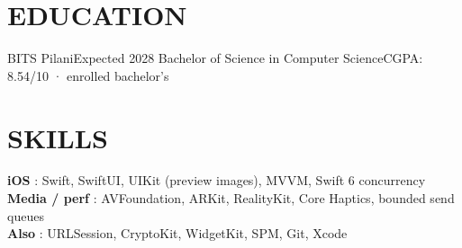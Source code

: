 \section{EDUCATION}
  \resumeSubHeadingListStart
    \resumeSubheading
      {BITS Pilani}{Expected 2028}
      {Bachelor of Science in Computer Science}{CGPA: 8.54/10 · enrolled bachelor's}
  \resumeSubHeadingListEnd

\section{SKILLS}
 \begin{itemize}[leftmargin=0in, label={}]
    \small{\item{
     \textbf{iOS} {: Swift, SwiftUI, UIKit (preview images), MVVM, Swift 6 concurrency} \vspace{1pt} \\
     \textbf{Media / perf} {: AVFoundation, ARKit, RealityKit, Core Haptics, bounded send queues} \vspace{1pt} \\
     \textbf{Also} {: URLSession, CryptoKit, WidgetKit, SPM, Git, Xcode}
    }}
 \end{itemize}


